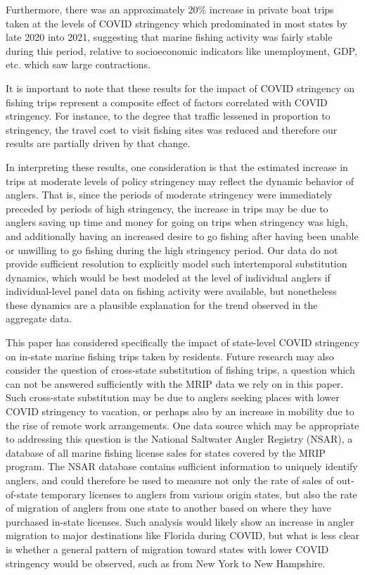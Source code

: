 \documentclass[12pt]{article}
\begin{document}
Furthermore, there was an approximately
20\% increase in private boat trips taken at the levels of COVID
stringency which predominated in most states by late 2020 into 2021,
suggesting that marine fishing activity was fairly stable
during this period, relative to socioeconomic indicators
like unemployment, GDP, etc. which saw large contractions. %

It is important to note that these results for the impact of COVID
stringency on fishing trips represent a composite effect of factors
correlated with COVID stringency. For instance, to the degree that
traffic lessened in proportion to stringency, the travel cost to visit
fishing sites was reduced and therefore our results are partially driven
by that change.

In interpreting these results, one consideration is that the estimated
increase in trips at moderate levels of policy stringency may reflect
the dynamic behavior of anglers. That is, since the periods of moderate
stringency were immediately preceded by periods of high stringency, the
increase in trips may be due to anglers saving up time and money for
going on trips when stringency was high, and additionally having an
increased desire to go fishing after having been unable or unwilling to
go fishing during the high stringency period. Our data do not provide
sufficient resolution to explicitly model such intertemporal
substitution dynamics, which would be best modeled at the level of
individual anglers if individual-level panel data on fishing activity
were available, but nonetheless these dynamics are a plausible
explanation for the trend observed in the aggregate data.


This paper has considered specifically the impact of state-level COVID
stringency on in-state marine fishing trips taken by residents. Future
research may also consider the question of cross-state substitution of
fishing trips, a question which can not be answered sufficiently with
the MRIP data we rely on in this paper. Such cross-state substitution
may be due to anglers seeking places with lower COVID stringency to
vacation, or perhaps also by an increase in mobility due to the rise of
remote work arrangements. One data source which may be appropriate to
addressing this question is the National Saltwater Angler Registry
(NSAR), a database of all marine fishing license sales for states
covered by the MRIP program. The NSAR database contains sufficient
information to uniquely identify anglers, and could therefore be used to
measure not only the rate of sales of out-of-state temporary licenses to
anglers from various origin states, but also the rate of migration of
anglers from one state to another based on where they have purchased
in-state licenses. Such analysis would likely show an increase in angler
migration to major destinations like Florida during COVID, but what is
less clear is whether a general pattern of migration toward states with
lower COVID stringency would be observed, such as from New York to New
Hampshire.
\end{document}
